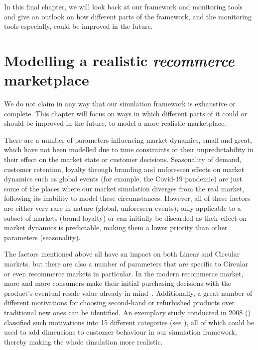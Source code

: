 \label{ch:Conclusions}

\begin{jointwork}
	In this final chapter, we will look back at our framework and monitoring tools and give an outlook on how different parts of the framework, and the monitoring tools especially, could be improved in the future.
\end{jointwork}

\section{Modelling a realistic \emph{recommerce} marketplace}\label{sec:DivergingFromRealMarket}

We do not claim in any way that our simulation framework is exhaustive or complete. This chapter will focus on ways in which different parts of it could or should be improved in the future, to model a more realistic marketplace.

There are a number of parameters influencing market dynamics, small and great, which have not been modelled due to time constraints or their unpredictability in their effect on the market state or customer decisions. Seasonality of demand, customer retention, loyalty through branding and unforeseen effects on market dynamics such as global events (for example, the Covid-19 pandemic) are just some of the places where our market simulation diverges from the real market, following its inability to model these circumstances. However, all of these factors are either very rare in nature (global, unforeseen events), only applicable to a subset of markets (brand loyalty) or can initially be discarded as their effect on market dynamics is predictable, making them a lower priority than other parameters (seasonality).

The factors mentioned above all have an impact on both Linear and Circular markets, but there are also a number of parameters that are specific to Circular or even recommerce markets in particular. In the modern recommerce market, more and more consumers make their initial purchasing decisions with the product's eventual resale value already in mind~\cite{ShoppingResaleValue}. Additionally, a great number of different motivations for choosing second-hand or refurbished products over traditional new ones can be identified. An exemplary study conducted in 2008 (\cite{SecondHandMotives}) classified such motivations into 15 different categories (see ), all of which could be used to add dimensions to customer behaviour in our simulation framework, thereby making the whole simulation more realistic.

